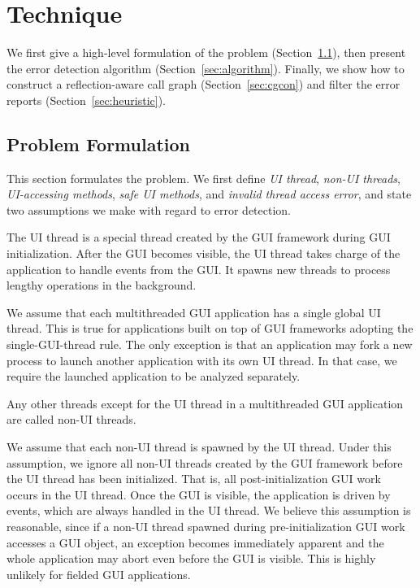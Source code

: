 \section{Technique}
\label{sec:technique}

We first give a high-level formulation of the problem (Section~\ref{sec:probl}), then present
the error detection algorithm (Section~\ref{sec:algorithm}). Finally, we show how to 
construct a reflection-aware call graph (Section~\ref{sec:cgcon}) and filter the error reports (Section~\ref{sec:heuristic}).


\subsection{Problem Formulation}
\label{sec:probl}

This section formulates the problem. We first define 
\textit{UI thread}, \textit{non-UI threads},
\textit{UI-accessing methods},
 \textit{safe UI methods}, and \textit{invalid thread access error}, and
state two assumptions we make with regard to error detection.

 {The UI thread
is a special thread created by the GUI framework during
GUI initialization. After the GUI becomes visible, the UI thread
takes charge of the application to handle events from the GUI.
It spawns new threads to process lengthy operations in the background. }\vspace{1mm}

 {We assume that each multithreaded
GUI application has a single global UI thread. This is true for applications
built on top of GUI frameworks adopting the single-GUI-thread rule. The
only exception is that 
 an application may fork a new process to launch another
application with its own UI thread. In that case, we require the
launched application to be analyzed separately.}\vspace{1mm}

 {Any other
threads except for the UI thread in a multithreaded GUI application
 are called non-UI threads.}\vspace{1mm}

 { We assume that each non-UI
thread is spawned by the UI thread. Under this assumption,
we ignore all non-UI threads created by the GUI framework
before the UI thread has been initialized. That is, all post-initialization
GUI work occurs in the UI thread. Once the GUI is visible, the
application is driven by events, which are always handled in the UI thread.
We believe this assumption is reasonable, since if a non-UI thread 
spawned during pre-initialization GUI work accesses a GUI object, an exception becomes
immediately apparent and the whole application may abort even before the
GUI is visible. This is highly unlikely for fielded GUI
applications.
}\vspace{1mm}

